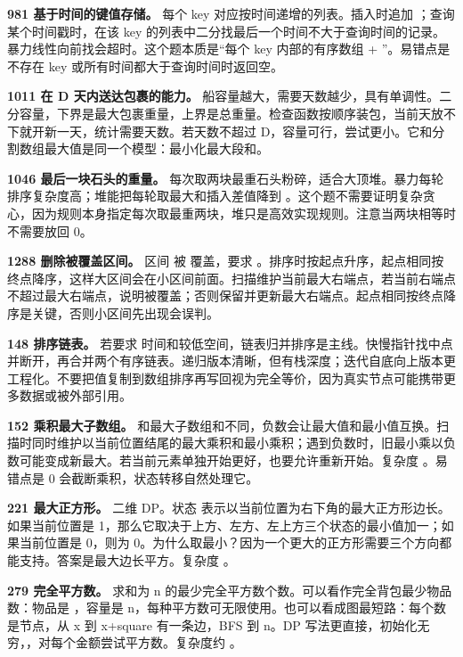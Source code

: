 \textbf{981 基于时间的键值存储。} 每个 key 对应按时间递增的列表。插入时追加 ；查询某个时间戳时，在该 key 的列表中二分找最后一个时间不大于查询时间的记录。暴力线性向前找会超时。这个题本质是“每个 key 内部的有序数组 + ”。易错点是不存在 key 或所有时间都大于查询时间时返回空。

\textbf{1011 在 D 天内送达包裹的能力。} 船容量越大，需要天数越少，具有单调性。二分容量，下界是最大包裹重量，上界是总重量。检查函数按顺序装包，当前天放不下就开新一天，统计需要天数。若天数不超过 D，容量可行，尝试更小。它和分割数组最大值是同一个模型：最小化最大段和。

\textbf{1046 最后一块石头的重量。} 每次取两块最重石头粉碎，适合大顶堆。暴力每轮排序复杂度高；堆能把每轮取最大和插入差值降到 。这个题不需要证明复杂贪心，因为规则本身指定每次取最重两块，堆只是高效实现规则。注意当两块相等时不需要放回 0。

\textbf{1288 删除被覆盖区间。} 区间 \code{[a,b]} 被 \code{[c,d]} 覆盖，要求 。排序时按起点升序，起点相同按终点降序，这样大区间会在小区间前面。扫描维护当前最大右端点，若当前右端点不超过最大右端点，说明被覆盖；否则保留并更新最大右端点。起点相同按终点降序是关键，否则小区间先出现会误判。

\textbf{148 排序链表。} 若要求  时间和较低空间，链表归并排序是主线。快慢指针找中点并断开，再合并两个有序链表。递归版本清晰，但有栈深度；迭代自底向上版本更工程化。不要把值复制到数组排序再写回视为完全等价，因为真实节点可能携带更多数据或被外部引用。

\textbf{152 乘积最大子数组。} 和最大子数组和不同，负数会让最大值和最小值互换。扫描时同时维护以当前位置结尾的最大乘积和最小乘积；遇到负数时，旧最小乘以负数可能变成新最大。若当前元素单独开始更好，也要允许重新开始。复杂度 。易错点是 0 会截断乘积，状态转移自然处理它。

\textbf{221 最大正方形。} 二维 DP。状态  表示以当前位置为右下角的最大正方形边长。如果当前位置是 1，那么它取决于上方、左方、左上方三个状态的最小值加一；如果当前位置是 0，则为 0。为什么取最小？因为一个更大的正方形需要三个方向都能支持。答案是最大边长平方。复杂度 。

\textbf{279 完全平方数。} 求和为 n 的最少完全平方数个数。可以看作完全背包最少物品数：物品是 ，容量是 n，每种平方数可无限使用。也可以看成图最短路：每个数是节点，从 x 到 x+square 有一条边，BFS 到 n。DP 写法更直接，初始化无穷，，对每个金额尝试平方数。复杂度约 。

